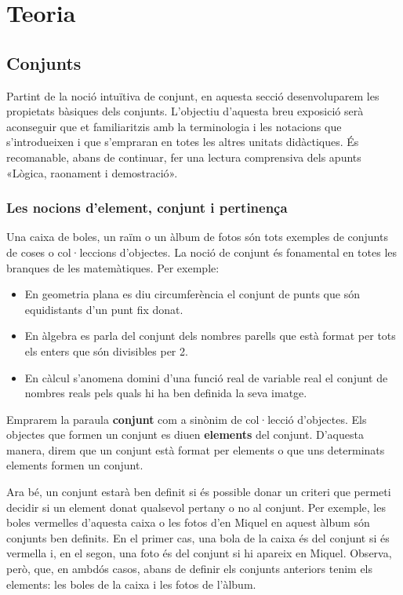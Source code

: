 \chapter{Teoria}
\label{cap:teoria}

\section{Conjunts}

Partint de la noció intuïtiva de conjunt, en aquesta secció
desenvoluparem les propietats bàsiques dels conjunts. L'objectiu
d'aquesta breu exposició serà aconseguir que et familiaritzis amb la
terminologia i les notacions que s'introdueixen i que s'empraran en totes
les altres unitats didàctiques. És recomanable, abans de continuar, fer
una lectura comprensiva dels apunts «Lògica, raonament
i demostració».

\subsection{Les nocions d'element, conjunt i pertinença}

Una caixa de boles, un raïm o un àlbum de fotos són tots
exemples de conjunts de coses o col·leccions d'objectes.
La noció de conjunt és fonamental en totes les branques de les matemàtiques. Per exemple:

\begin{itemize}
\item En geometria plana es diu circumferència el conjunt de punts que són equidistants d'un punt fix donat.

\item En àlgebra es parla del conjunt dels nombres parells que està
format per tots els enters que són divisibles per 2.

\item En càlcul s'anomena domini d'una funció real de variable real
el conjunt de nombres reals pels quals hi ha ben definida la seva imatge.
\end{itemize}

Emprarem la paraula \textbf{conjunt} com a sinònim de
col·lecció d'objectes. Els objectes que formen un
conjunt es diuen \textbf{elements} del conjunt. D'aquesta manera, direm que
un conjunt està format per elements o que uns determinats elements
formen un conjunt.

\bigskip

Ara bé, un conjunt estarà ben definit si és possible donar un
criteri que permeti decidir si un element donat qualsevol pertany o no al
conjunt. Per exemple, les boles vermelles d'aquesta caixa o les fotos d'en
Miquel en aquest àlbum són conjunts ben definits. En el primer cas,
una bola de la caixa és del conjunt si és vermella i, en el segon,
una foto és del conjunt si hi apareix en Miquel. Observa, però, que,
en ambdós casos, abans de definir els conjunts anteriors tenim els
elements: les boles de la caixa i les fotos de l'àlbum.

